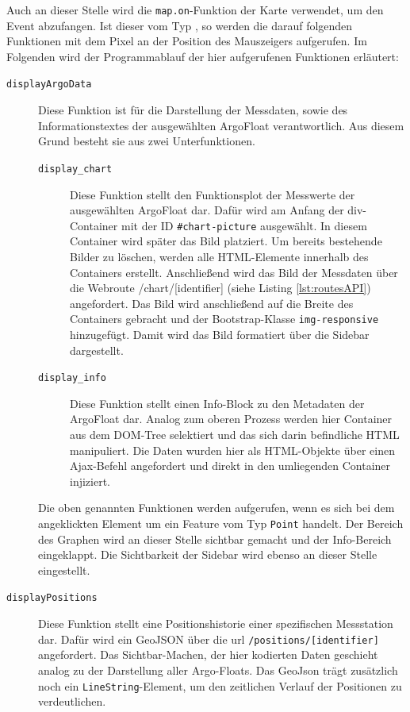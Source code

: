 Auch an dieser Stelle wird die \texttt{map.on}-Funktion der Karte verwendet, um den Event abzufangen. Ist dieser vom Typ , so werden die darauf folgenden Funktionen mit dem Pixel an der Position des Mauszeigers aufgerufen. Im Folgenden wird der Programmablauf der hier aufgerufenen Funktionen erläutert:

\begin{description}
 \item [\texttt{displayArgoData}]
    Diese Funktion ist für die Darstellung der Messdaten, sowie des Informationstextes der ausgewählten ArgoFloat verantwortlich. Aus diesem Grund besteht sie aus zwei Unterfunktionen.
    \begin{description}
    \item [\texttt{display\_chart}]
        Diese Funktion stellt den Funktionsplot der Messwerte der ausgewählten ArgoFloat dar. Dafür wird am Anfang der div-Container mit der ID \texttt{\#chart-picture} ausgewählt. In diesem Container wird später das Bild platziert. Um bereits bestehende Bilder zu löschen, werden alle HTML-Elemente innerhalb des Containers erstellt. Anschließend wird das Bild der Messdaten über die Webroute /chart/[identifier]  (siehe Listing \ref{lst:routesAPI}) angefordert. Das Bild wird anschließend auf die Breite des Containers gebracht und der Bootstrap-Klasse \texttt{img-responsive} hinzugefügt. Damit wird das Bild formatiert über die Sidebar dargestellt.
    \item [\texttt{display\_info}]
        Diese Funktion stellt einen Info-Block zu den Metadaten der ArgoFloat dar. Analog zum oberen Prozess werden hier Container aus dem DOM-Tree selektiert und das sich darin befindliche  HTML manipuliert. Die Daten wurden hier als HTML-Objekte über einen Ajax-Befehl angefordert und direkt in den umliegenden Container injiziert.
    \end{description}

    Die oben genannten Funktionen werden aufgerufen, wenn es sich bei dem angeklickten Element um ein Feature vom Typ \texttt{Point} handelt. Der Bereich des Graphen wird an dieser Stelle sichtbar gemacht und der Info-Bereich eingeklappt. Die Sichtbarkeit der Sidebar wird ebenso an dieser Stelle eingestellt.

 \item [\texttt{displayPositions}]
    Diese Funktion stellt eine Positionshistorie einer spezifischen Messstation dar. Dafür wird ein GeoJSON über die url \texttt{/positions/[identifier]} angefordert. Das Sichtbar-Machen, der hier kodierten Daten geschieht analog zu der Darstellung aller Argo-Floats. Das GeoJson trägt zusätzlich noch ein \texttt{LineString}-Element, um den zeitlichen Verlauf der Positionen zu verdeutlichen.
\end{description}





